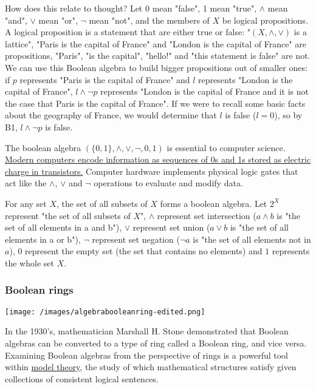 \documentclass{article}
\begin{document}
\begin{itemize}
{\begin{itemize}
\begin{itemize}
How does this relate to thought? Let $ 0$ mean "false", 1 mean "true", $ \land$ mean "and", $ \lor$ mean "or", $ \neg$ mean "not", and the members of $ X$ be logical propositions. A logical proposition is a statement that are either true or false: "$ (X, \land, \lor)$ is a lattice", "Paris is the capital of France" and "London is the capital of France" are propositions, "Paris", "is the capital", "hello!" and "this statement is false" are not.  We can use this Boolean algebra to build bigger propositions out of smaller ones: if $ p$ represents "Paris is the capital of France" and $ l$ represents "London is the capital of France", $ l \land \neg p$ represents "London is the capital of France and it is not the case that Paris is the capital of France". If we were to recall some basic facts about the geography of France, we would determine that $ l$ is false ($ l = 0$), so by B1, $ l \land \neg p$ is false.

The boolean algebra $ (\{0, 1\}, \land, \lor, \neg, 0, 1)$ is essential to computer science. \href{https://www.bbc.co.uk/bitesize/guides/zwsbwmn/revision/1}{Modern computers encode information as sequences of 0s and 1s stored as electric charge in transistors.} Computer hardware implements physical logic gates that act like the $ \land$, $ \lor$ and $ \neg$ operations to evaluate and modify data. 

For any set $ X$, the set of all subsets of $ X$ forms a boolean algebra. Let $ 2^X$ represent "the set of all subsets of $ X$", $ \land$ represent set intersection ($ a\land b$ is "the set of all elements in a and b"), $ \lor$ represent set union ($ a \lor b$ is "the set of all elements in a or b"), $ \neg$ represent set negation ($ \neg a$ is "the set of all elements not in $ a$), $ 0$ represent the empty set (the set that contains no elements) and $ 1$ represents the whole set $ X$. 

\subsubsection{Boolean rings}

\texttt{[image: /images/algebrabooleanring-edited.png]}

In the 1930's, mathematician Marshall H. Stone demonstrated that Boolean algebras can be converted to a type of ring called a Boolean ring, and vice versa. Examining Boolean algebras from the perspective of rings is a powerful tool within \href{https://plato.stanford.edu/entries/model-theory/}{model theory}, the study of which mathematical structures satisfy given collections of consistent logical sentences.


\end{itemize}
\end{itemize}}
\end{itemize}
\end{document}
